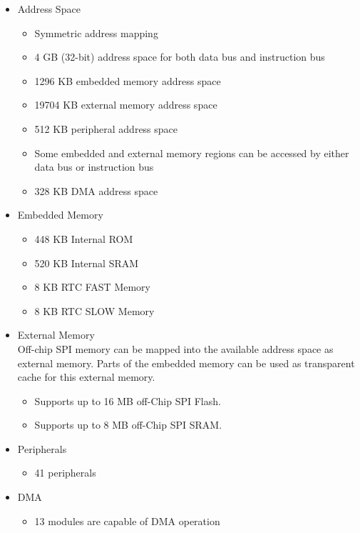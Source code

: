 \documentclass[main\_\_EN.tex]{subfiles}
\begin{document}
\begin{itemize}
    \item Address Space
        \begin{itemize}
            \item Symmetric address mapping
            \item 4 GB (32-bit) address space for both data bus and instruction bus
    	    \item 1296 KB embedded memory address space
    	    \item 19704 KB external memory address space
    	    \item 512 KB peripheral address space
    	    \item Some embedded and external memory regions can be accessed by either data bus or instruction bus
    	    \item 328 KB DMA address space
        \end{itemize}
    \item Embedded Memory
        \begin{itemize}
            \item 448 KB Internal ROM
	        \item 520 KB Internal SRAM
	        \item 8 KB RTC FAST Memory
	        \item 8 KB RTC SLOW Memory
	    \end{itemize}
    \item External Memory \\
        Off-chip SPI memory can be mapped into the available address space as external memory. Parts of the embedded memory can be used as transparent cache for this external memory.
        \begin{itemize}
            \item Supports up to 16 MB off-Chip SPI Flash.
	        \item Supports up to 8 MB off-Chip SPI SRAM.
	    \end{itemize}
    \item Peripherals
        \begin{itemize}
            \item 41 peripherals
        \end{itemize}
    \item DMA
        \begin{itemize}
            \item 13 modules are capable of DMA operation
        \end{itemize}
\end{itemize}
\end{document}
